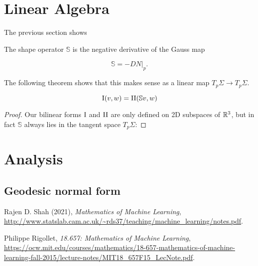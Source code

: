 \documentclass[11pt]{scrartcl}
\begin{document}
\section{Linear Algebra}

The previous section shows 

\begin{definition}
The shape operator $\mathbb{S}$ is the negative derivative of the Gauss map 

\begin{equation}
    \mathbb{S} = - D N|_p.
\end{equation}

The following theorem shows that this makes sense as a linear map $T_p \Sigma \rightarrow T_p \Sigma$.
\end{definition}

\begin{theorem}
\begin{equation}
    \text{I}(v,w) = \text{II}(\mathbb{S}v,w)
\end{equation}

\begin{proof}
Our bilinear forms $\text{I}$ and $\text{II}$ are only defined on 2D subspaces of $\mathbb R^3$, but in fact $\mathbb{S}$ always lies in the tangent space $T_p \Sigma$:

\end{proof}
\end{theorem}

\section{Analysis}

\subsection{Geodesic normal form}

\begin{thebibliography}{9}
Rajen D. Shah (2021), \emph{Mathematics of Machine Learning}, \url{http://www.statslab.cam.ac.uk/~rds37/teaching/machine_learning/notes.pdf}.

Philippe Rigollet, \emph{18.657: Mathematics of Machine Learning}, \url{https://ocw.mit.edu/courses/mathematics/18-657-mathematics-of-machine-learning-fall-2015/lecture-notes/MIT18_657F15_LecNote.pdf}.

\end{thebibliography}
\end{document}
